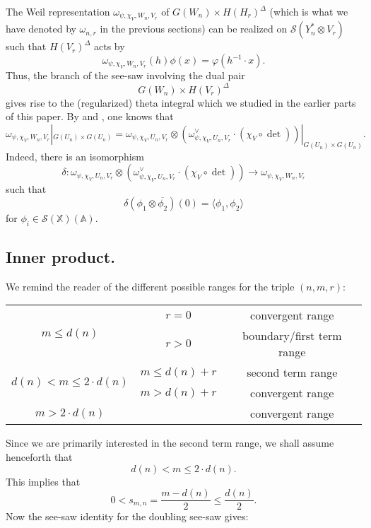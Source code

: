 \documentclass[10pt]{amsart}
\theoremstyle{plain}
\numberwithin{equation}{section}
\begin{document}
 The Weil representation $\omega_{\psi, \chi_V, W_n, V_r}$ of
 $G(W_n)\times H(H_r)^{\Delta}$ (which is what we have denoted by
 $\omega_{n,r}$ in the previous sections) can be realized on
 $\mathcal{S}(Y_n^*\otimes V_r)$ such  that $H(V_r)^{\Delta}$ acts by
\[   \omega_{\psi, \chi_V, W_n, V_r}(h) \phi(x)  =  \varphi(h^{-1}\cdot x). \] 
 Thus, the  branch of the see-saw involving the dual pair 
 \[  G(W_n)\times H(V_r)^{\Delta} \]
 gives rise to the (regularized) theta integral which we studied in
 the earlier parts of this paper. By \cite{K2} and \cite{HKS}, one knows that
 \[  \omega_{\psi, \chi_V, W_n, V_r}|_{G(U_n) \times G(U_n)} 
  =  \omega_{\psi, \chi_V, U_n, V_r} \otimes \left(
    \omega_{\psi,\chi_V, U_n, V_r}^{\vee} 
\cdot (\chi_V \circ \det) \right)|_{G(U_n) \times G(U_n)} . \]
  Indeed, there is an isomorphism \cite[Pg. 182]{Li}
  \[  \delta: 
   \omega_{\psi, \chi_V, U_n, V_r} \otimes \left( 
\omega_{\psi,\chi_V, U_n, V_r}^{\vee} \cdot (\chi_V \circ \det) \right)
   \longrightarrow   \omega_{\psi, \chi_V, W_n, V_r} \]
  such that
  \[  \delta(\phi_1\otimes \overline{\phi_2})(0)  = \langle \phi_1, \phi_2 \rangle \]
  for $\phi_i \in {\mathcal{S}}(\mathbb{X})({\mathbb{A}})$.
   \vskip 10pt
  
 \subsection{\bf Inner product.} 
 We remind the reader of the different possible ranges for the triple $(n,m, r)$:
\vskip 5pt

 \begin{center}
 
 \begin{tabular}{|c|c|c|}
 \hline
 \multirow{2}{*}{$m \leq d(n)$} & $r=0$ &  convergent range   \\
 \cline{2-3}
  &$r >0$ & boundary/first term range  \\
  \hline
  \multirow{2}{*}{$d(n) <  m \leq 2 \cdot d(n)$} & $m \leq d(n) +r$  & second term range \\
  \cline{2-3}
  & $m  > d(n) +r$ &  convergent range \\
  \hline
   $ m> 2 \cdot d(n)$ &   & convergent range  \\
  \hline
\end{tabular}
\end{center}
 \vskip 5pt
 
\noindent  Since we are primarily interested in the second term range, we shall assume henceforth that
 \[  d(n)  < m \leq  2 \cdot d(n). \]
  This implies that
  \[  0 < s_{m,n} = \frac{m-d(n)}{2} \leq \frac{d(n)}{2}. \]
  Now the see-saw identity for the doubling see-saw gives:
 \vskip 5pt
  
\end{document}
